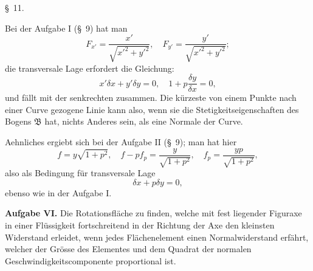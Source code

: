 \documentclass[11pt,a4paper,leqno]{article}
\begin{document}
\begin{center}{\large \S~11.}\end{center}

Bei der Aufgabe I (\S~9) hat man
\[
F_{x'}=\frac{x'}{\sqrt{x'^2+y'^2}},\quad F_{y'}=\frac{y'}{\sqrt{x'^2+y'^2}};
\]
die transversale Lage erfordert die Gleichung:
\[
x'\delta x+y'\delta y=0,\quad 1+p\frac{\delta y}{\delta x}=0,
\]
und fällt mit der senkrechten zusammen. Die kürzeste von einem Punkte nach einer Curve gezogene Linie kann also, wenn sie die Stetigkeitseigenschaften des Bogens $\mathfrak{B}$ hat, nichts Anderes sein, als eine Normale der Curve.

Aehnliches ergiebt sich bei der Aufgabe II (\S~9); man hat hier
\[
f=y\sqrt{1+p^2},\quad f-pf_p=\frac{y}{\sqrt{1+p^2}},\quad f_p=\frac{yp}{\sqrt{1+p^2}},
\]
also als Bedingung für transversale Lage
\[
\delta x+p\delta y=0,
\]
ebenso wie in der Aufgabe I.

\medskip
\noindent\textbf{Aufgabe VI.} Die Rotationsfläche zu finden, welche mit fest liegender Figuraxe in einer Flüssigkeit fortschreitend in der Richtung der Axe den kleinsten Widerstand erleidet, wenn jedes Flächenelement einen Normalwiderstand erfährt, welcher der Grösse des Elementes und dem Quadrat der normalen Geschwindigkeitscomponente proportional ist.
\end{document}

